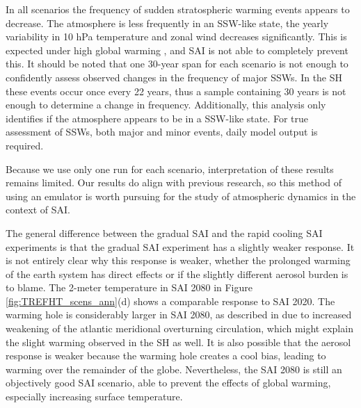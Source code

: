 In all scenarios the frequency of sudden stratospheric warming events appears to decrease. The atmosphere is less frequently in an SSW-like state, the yearly variability in 10 hPa temperature and zonal wind decreases significantly. This is expected under high global warming \parencite{jucker2021}, and SAI is not able to completely prevent this. It should be noted that one 30-year span for each scenario is not enough to confidently assess observed changes in the frequency of major SSWs. In the SH these events occur once every 22 years, thus a sample containing 30 years is not enough to determine a change in frequency. Additionally, this analysis only identifies if the atmosphere appears to be in a SSW-like state. For true assessment of SSWs, both major and minor events, daily model output is required.

Because we use only one run for each scenario, interpretation of these results remains limited. Our results do align with previous research, so this method of using an emulator is worth pursuing for the study of atmospheric dynamics in the context of SAI. 

The general difference between the gradual SAI and the rapid cooling SAI experiments is that the gradual SAI experiment has a slightly weaker response. It is not entirely clear why this response is weaker, whether the prolonged warming of the earth system has direct effects or if the slightly different aerosol burden is to blame. The 2-meter temperature in SAI 2080 in Figure \ref{fig:TREFHT_scens_ann}(d) shows a comparable response to SAI 2020. The warming hole is considerably larger in SAI 2080, as described in \textcite{pfluger2024} due to increased weakening of the atlantic meridional overturning circulation, which might explain the slight warming observed in the SH as well. It is also possible that the aerosol response is weaker because the warming hole creates a cool bias, leading to warming over the remainder of the globe. Nevertheless, the SAI 2080 is still an objectively good SAI scenario, able to prevent the effects of global warming, especially increasing surface temperature. 